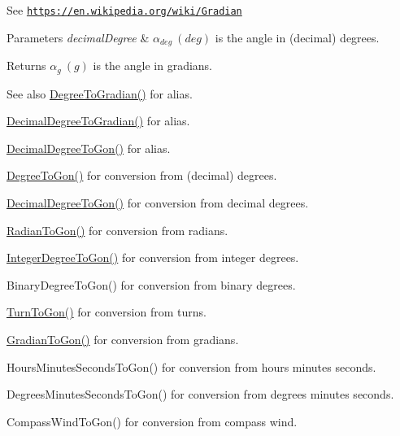 See \href{https://en.wikipedia.org/wiki/Gradian}{\tt https\+://en.\+wikipedia.\+org/wiki/\+Gradian} 
\begin{DoxyParams}{Parameters}
{\em decimal\+Degree} & $\alpha_{deg}\ (deg)$ is the angle in (decimal) degrees. \\
\hline
\end{DoxyParams}
\begin{DoxyReturn}{Returns}
$\alpha_{g}\ (g)$ is the angle in gradians. 
\end{DoxyReturn}
\begin{DoxySeeAlso}{See also}
\mbox{\hyperlink{group___e_g_x_math-_angle_conversions-_degree_ga25bb5506b3f66fff7a1b85bf7bd795b3}{Degree\+To\+Gradian()}} for alias. 

\mbox{\hyperlink{group___e_g_x_math-_angle_conversions-_decimal_degree_ga3ac6f1ceb36a4938cdf3b55554734c99}{Decimal\+Degree\+To\+Gradian()}} for alias. 

\mbox{\hyperlink{group___e_g_x_math-_angle_conversions-_decimal_degree_gaeb333a1ad0aeb913c025fbd1be85fcb3}{Decimal\+Degree\+To\+Gon()}} for alias. 

\mbox{\hyperlink{group___e_g_x_math-_angle_conversions-_degree_ga87c3fab0867021e5d2501197b4db6194}{Degree\+To\+Gon()}} for conversion from (decimal) degrees. 

\mbox{\hyperlink{group___e_g_x_math-_angle_conversions-_decimal_degree_gaeb333a1ad0aeb913c025fbd1be85fcb3}{Decimal\+Degree\+To\+Gon()}} for conversion from decimal degrees. 

\mbox{\hyperlink{group___e_g_x_math-_angle_conversions-_radian_ga36912e5a810b64c271c4dafc17f4ca45}{Radian\+To\+Gon()}} for conversion from radians. 

\mbox{\hyperlink{group___e_g_x_math-_angle_conversions-_integer_degree_ga6e5be425c37ad27319f09329156c64bb}{Integer\+Degree\+To\+Gon()}} for conversion from integer degrees. 

Binary\+Degree\+To\+Gon() for conversion from binary degrees. 

\mbox{\hyperlink{group___e_g_x_math-_angle_conversions-_turn_gad81dd0bb1660ef24e28fa15b2403dec7}{Turn\+To\+Gon()}} for conversion from turns. 

\mbox{\hyperlink{group___e_g_x_math-_angle_conversions-_gradian_gaff399262b6c8455e450e0a9dc8eb2ad1}{Gradian\+To\+Gon()}} for conversion from gradians. 

Hours\+Minutes\+Seconds\+To\+Gon() for conversion from hours minutes seconds. 

Degrees\+Minutes\+Seconds\+To\+Gon() for conversion from degrees minutes seconds. 

Compass\+Wind\+To\+Gon() for conversion from compass wind. 
\end{DoxySeeAlso}
\mbox{\label{group___e_g_x_math-_angle_conversions-_degree_ga25bb5506b3f66fff7a1b85bf7bd795b3}} 
